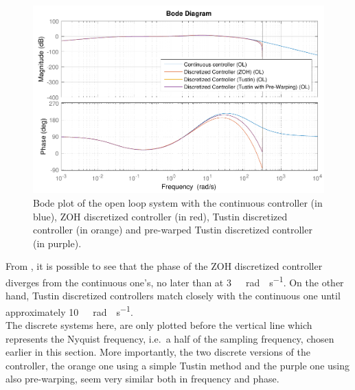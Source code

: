 \begin{figure}[H]
  \centering
  \includegraphics[scale=.6]{figures/zohVsPrewarpVsNoPrewarpVsContinuousBodeOpenLoop}
  \caption{Bode plot of the open loop system with the continuous controller (in blue), ZOH discretized controller (in red), Tustin discretized controller (in orange) and pre-warped Tustin discretized controller (in purple).}
  \label{fig:bodePrewarpVsNoPrewarpVsContinuousOpenLoop}
\end{figure}\vspace{-18pt}
From , it is possible to see that the phase of the ZOH discretized controller diverges from the continuous one's, no later than at \si{3\ rad \cdot s^{-1}}. On the other hand, Tustin discretized controllers match closely with the continuous one until approximately \si{10\ rad \cdot s^{-1}}. \\
The discrete systems here, are only plotted before the vertical line which represents the Nyquist frequency, i.e.~a half of the sampling frequency, chosen earlier in this section. More importantly, the two discrete versions of the controller, the orange one using a simple Tustin method and the purple one using also pre-warping, seem very similar both in frequency and phase.

